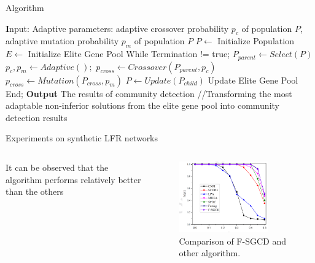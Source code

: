 \documentclass[aspectratio=169,xcolor=dvipsnames]{beamer}
\begin{document}
\begin{frame}{Algorithm}
    \begin{algorithm}[H]
        \begin{algorithmic}[1]
        \STATE \textbf Input: Adaptive parameters: adaptive crossover probability $p_{c}$ of
        population $P$, adaptive mutation probability $p_{m}$ of population $P$
        \STATE $P \leftarrow $ Initialize Population
        \STATE $E \leftarrow $ Initialize Elite Gene Pool
        \STATE While Termination != true;
        \STATE $P_{parent} \leftarrow Select(P)$
        \STATE $p_{c}, p_{m} \leftarrow Adaptive();$
        \STATE $p_{cross} \leftarrow Crossover(P_{parent}, p_{c})$
        \STATE $p_{cross} \leftarrow Mutation(P_{cross}, p_{m})$
        \STATE $P \leftarrow Update(P_{child})$
        \STATE Update Elite Gene Pool
        \STATE End;
        \STATE \textbf{Output} The results of community detection //{Transforming the most adaptable non-inferior solutions from the elite gene pool into community detection results}
        \end{algorithmic}
        \caption{Framework of F-SGCD Algorithm}
        \label{alg:seq}
    \end{algorithm}
\end{frame}


\begin{frame}{Experiments on synthetic LFR networks}
    \begin{columns}
        \begin{column}{0.5\textwidth}
                It can be observed that the algorithm performs relatively better than the others
        \end{column}
        \begin{column}{0.5\textwidth}
            \begin{figure}
            \centering
                \includegraphics[width=0.8\textwidth]{synthetic-LFR.PNG}
                \caption{Comparison of F-SGCD and other algorithm.}
            \end{figure}
        \end{column}
    \end{columns}
\end{frame}
\end{document}

